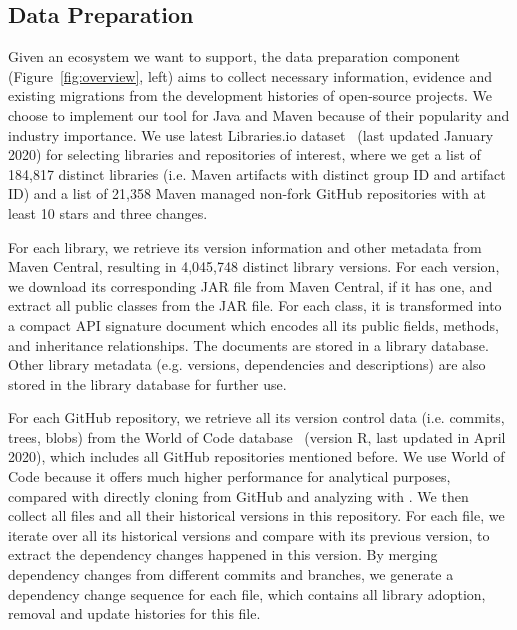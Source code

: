 \documentclass[conference,10pt]{IEEEtran}
\begin{document}
\subsection{Data Preparation}

Given an ecosystem we want to support, the data preparation component (Figure~\ref{fig:overview}, left) aims to collect necessary information, evidence and existing migrations from the development histories of open-source projects.
We choose to implement our tool for Java and Maven because of their popularity and industry importance.
We use latest Libraries.io dataset~\cite{libraries-io} (last updated January 2020) for selecting libraries and repositories of interest, where we get a list of 184,817 distinct libraries (i.e. Maven artifacts with distinct group ID and artifact ID) and a list of 21,358 Maven managed non-fork GitHub repositories with at least 10 stars and three  changes. %

For each library, we retrieve its version information and other metadata from Maven Central, resulting in 4,045,748 distinct library versions.
For each version, we download its corresponding JAR file from Maven Central, if it has one, and extract all public classes from the JAR file. 
For each class, it is transformed into a compact API signature document which encodes all its public fields, methods, and inheritance relationships.
The documents are stored in a library database.
Other library metadata (e.g. versions, dependencies and descriptions) are also stored in the library database for further use.

For each GitHub repository, we retrieve all its version control data (i.e. commits, trees, blobs) from the World of Code database~\cite{ma2019world} (version R, last updated in April 2020), which includes all GitHub repositories mentioned before.
We use World of Code because it offers much higher performance for analytical purposes, compared with directly cloning from GitHub and analyzing with .
We then collect all  files and all their historical versions in this repository. %
For each  file, we iterate over all its historical versions and compare with its previous version, to extract the dependency changes happened in this version.
By merging dependency changes from different commits and branches, we generate a dependency change sequence for each  file, which contains all library adoption, removal and update histories for this  file.
\end{document}
